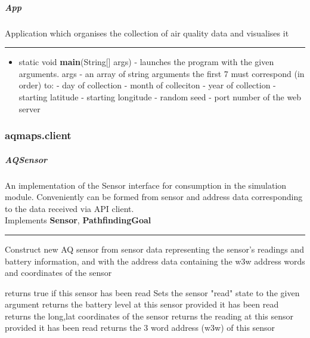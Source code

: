 \documentclass[10pt,a4paper]{article}
\newenvironment{mitem}{%
  \multienumerate\renewcommand{\labelname}{\textbullet}%
}{%
  \endmultienumerate%
}
\begin{document}
\subparagraph{App}
Application which organises the collection of air quality data and visualises it
\hrule
\begin{itemize}[noitemsep]
    \item static void \textbf{main}(String[] args) - launches the program with the given arguments.
        \subitem args - an array of string arguments the first 7 must correspond (in order) to:
            \subsubitem - day of collection 
            \subsubitem - month of colleciton 
            \subsubitem - year of collection
            \subsubitem - starting latitude
            \subsubitem - starting longitude
            \subsubitem - random seed
            \subsubitem - port number of the web server
\end{itemize}

\subsubsection{aqmaps.client}
\label{sec:aqmaps.client}

\subparagraph{AQSensor} An implementation of the Sensor interface for consumption in the simulation module. Conveniently can be formed from sensor and address data corresponding to the data received via API client.
\\

Implements \textbf{Sensor}, \textbf{PathfindingGoal}
\hrule

\begin{mitem}
    \scriptsize
    {Construct new AQ sensor from sensor data representing the sensor's readings and battery information, and with the address data containing the w3w address words and coordinates of the sensor}

    {returns true if this sensor has been read}
    {Sets the sensor "read" state to the given argument}
    { returns the battery level at this sensor provided it has been read}
    {returns the long,lat coordinates of the sensor}
    {returns the reading at this sensor provided it has been read}
    {returns the 3 word address (w3w) of this sensor}
\end{mitem}
\end{document}
